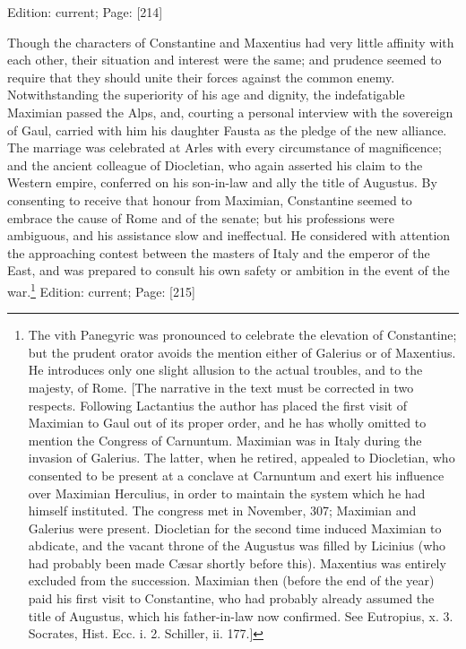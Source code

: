 Edition: current; Page: [214]

Though the characters of Constantine and Maxentius had very little affinity with each other, their situation and interest were the same; and prudence seemed to require that they should unite their forces against the common enemy. Notwithstanding the superiority of his age and dignity, the indefatigable Maximian passed the Alps, and, courting a personal interview with the sovereign of Gaul, carried with him his daughter Fausta as the pledge of the new alliance. The marriage was celebrated at Arles with every circumstance of magnificence; and the ancient colleague of Diocletian, who again asserted his claim to the Western empire, conferred on his son-in-law and ally the title of Augustus. By consenting to receive that honour from Maximian, Constantine seemed to embrace the cause of Rome and of the senate; but his professions were ambiguous, and his assistance slow and ineffectual. He considered with attention the approaching contest between the masters of Italy and the emperor of the East, and was prepared to consult his own safety or ambition in the event of the war.\footnote{The vith Panegyric was pronounced to celebrate the elevation of Constantine; but the prudent orator avoids the mention either of Galerius or of Maxentius. He introduces only one slight allusion to the actual troubles, and to the majesty, of Rome. [The narrative in the text must be corrected in two respects. Following Lactantius the author has placed the first visit of Maximian to Gaul out of its proper order, and he has wholly omitted to mention the Congress of Carnuntum. Maximian was in Italy during the invasion of Galerius. The latter, when he retired, appealed to Diocletian, who consented to be present at a conclave at Carnuntum and exert his influence over Maximian Herculius, in order to maintain the system which he had himself instituted. The congress met in November, 307; Maximian and Galerius were present. Diocletian for the second time induced Maximian to abdicate, and the vacant throne of the Augustus was filled by Licinius (who had probably been made Cæsar shortly before this). Maxentius was entirely excluded from the succession. Maximian then (before the end of the year) paid his first visit to Constantine, who had probably already assumed the title of Augustus, which his father-in-law now confirmed. See Eutropius, x. 3. Socrates, Hist. Ecc. i. 2. Schiller, ii. 177.]}
Edition: current; Page: [215]

